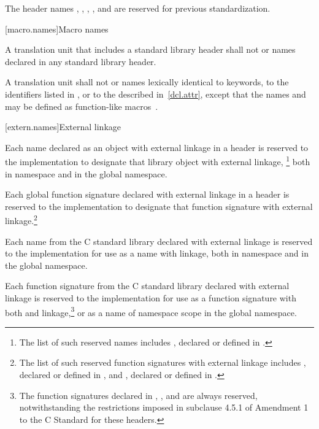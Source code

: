 \pnum
The header names
,
,
,
, and
are reserved for previous standardization.

[macro.names]{Macro names}

\pnum
{}%
%
A translation unit that includes a standard library header shall not
 or  names declared in any standard
library header.

\pnum
{}%
A translation unit shall not  or 
names lexically identical
to keywords,
to the identifiers listed in , or
to the  described in~\ref{dcl.attr},
except that the names  and  may be
defined as function-like macros~.

[extern.names]{External linkage}

\pnum
Each name declared as an object with external linkage
%
in a header is reserved to the implementation to designate that library
object with external linkage,%
\footnote{The list of such reserved names includes
, declared or defined in .}
both in namespace  and in the global namespace.

\pnum
Each
%
global function signature declared with
%
external linkage in a header is reserved to the
implementation to designate that function signature with
%
external linkage.\footnote{The list of such reserved function
signatures with external linkage includes
%
,
declared or defined in ,
and
%
%
,
declared or defined in
.}

\pnum
Each name from the C standard library declared with external linkage
%
is reserved to the implementation for use as a name with
%
%
linkage,
both in namespace  and in the global namespace.

\pnum
Each function signature from the C standard library declared with
%
external linkage
is reserved to the implementation for use as
a function signature with both
%
and
%
linkage,\footnote{The function signatures declared in
%
,
,
and
are always reserved, notwithstanding the restrictions imposed in subclause
4.5.1 of Amendment 1 to the C Standard for these headers.}
or as a name of namespace scope in the global namespace.

